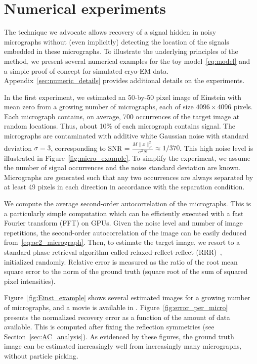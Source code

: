 \documentclass[9pt,twocolumn,twoside,lineno]{pnas-new}
\begin{document}
\section{Numerical experiments}

The technique we advocate allows recovery of a signal hidden in noisy micrographs without (even implicitly)  detecting the location  of the signals embedded in these micrographs. To illustrate the underlying principles of the method, we present several numerical examples for the toy model~\eqref{eq:model} and a simple proof of concept for simulated cryo-EM data.  Appendix~\ref{sec:numeric_details} provides additional details on the experiments.

In the first experiment, we estimated 
an 50-by-50 pixel image of Einstein with mean zero from a growing number of micrographs, each of size $4096\times 4096$ pixels. Each micrograph contains, on average, 700 occurrences of the target image at random locations. 
Thus, about 10\% of each micrograph contains signal. The micrographs are contaminated with additive white Gaussian noise with standard deviation $\sigma=3$,  corresponding  to SNR = $\frac{M\|x\|_F^2} {\sigma^2N} \approx1/370$. This high noise level is illustrated in Figure~\ref{fig:micro_example}. 
To simplify the experiment, we assume the number of signal occurrences and the noise standard deviation are known. Micrographs are generated such that any two occurrences are always separated by at least 49 pixels in each direction in accordance with the separation condition. %

We compute the average second-order autocorrelation of the micrographs. This is a particularly simple computation which can be efficiently executed with a fast Fourier transform (FFT) on GPUs. Given the noise level and number of image repetitions, the second-order autocorrelation of the image can be easily deduced from~\eqref{eq:ac2_micrograph}.  Then, to estimate the target image, we resort to a standard phase retrieval algorithm called relaxed-reflect-reflect (RRR)~\cite{elser2017rrr}, initialized randomly.
Relative error is measured as the ratio of the root mean square error to the norm of the ground truth (square root of the sum of squared pixel intensities).

Figure~\ref{fig:Einst_example} shows several estimated images for a growing number of micrographs, and a movie is available in . Figure~\ref{fig:error_per_micro} presents the normalized recovery error as a function of the amount of data available.  This is computed after fixing the reflection symmetries (see Section~\ref{sec:AC_analysis}). As evidenced by these figures, the ground truth image can be estimated increasingly well from increasingly many micrographs, without particle picking.
\end{document}
